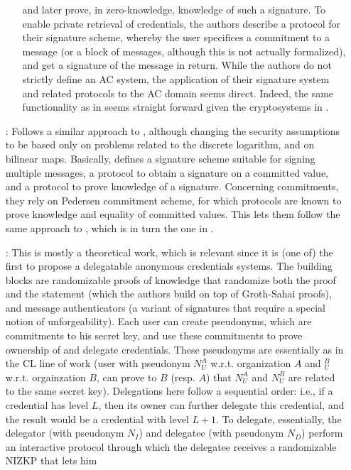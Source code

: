 \begin{enumerate}
\begin{itemize}
    and later prove, in zero-knowledge, knowledge of such a signature. To
    enable private retrieval of credentials, the authors describe a protocol
    for their signature scheme, whereby the user specifices a commitment to
    a message (or a block of messages, although this is not actually
    formalized), and get a signature of the message in return. While the
    authors do not strictly define an AC system, the application of their
    signature system and related protocols to the AC domain seems direct.
    Indeed, the same functionality as in \cite{cl01} seems straight
    forward given the cryptosystems in \cite{cl02}.
  \end{itemize}
\item[\cite{cl04}:] Follows a similar approach to \cite{cl02}, although
  changing the security assumptions to be based only on problems related
  to the discrete logarithm, and on bilinear maps. Basically, defines a
  signature scheme suitable for signing multiple messages, a protocol to
  obtain a signature on a committed value, and a protocol to prove knowledge
  of a signature. Concerning commitments, they rely on Pedersen commitment
  scheme, for which protocols are known to prove knowledge and equality of
  committed values. This lets them follow the same approach to \cite{cl02},
  which is in turn the one in \cite{cl01}.
\item[\cite{bcc+09}:] This is mostly a theoretical work, which is relevant
  since it is (one of) the first to propose a delegatable anonymous
  credentials systems. The building blocks are randomizable proofs of
  knowledge that randomize both the proof and the statement (which the authors
  build on top of Groth-Sahai proofs), and message authenticators (a variant
  of signatures that require a special notion of unforgeability). Each user
  can create pseudonyms, which are commitments to his secret key, and use
  these commitments to prove ownership of and delegate credentials. These
  pseudonyms are essentially as in the CL line of work (user with pseudonym
  $N^A_U$ w.r.t. organization $A$ and $^B_U$ w.r.t. orgainzation $B$, can
  prove to $B$ (resp. $A$) that $N^A_U$ and $N^B_U$ are related to the
  same secret key). Delegations here follow a sequential order: i.e., if
  a credential has level $L$, then its owner can further delegate this
  credential, and the result would be a credential with level $L+1$. To
  delegate, essentially, the delegator (with pseudonym $N_I$) and delegatee
  (with pseudonym $N_D$) perform an interactive protocol
  through which the delegatee receives a randomizable NIZKP that lets him

\end{enumerate}
